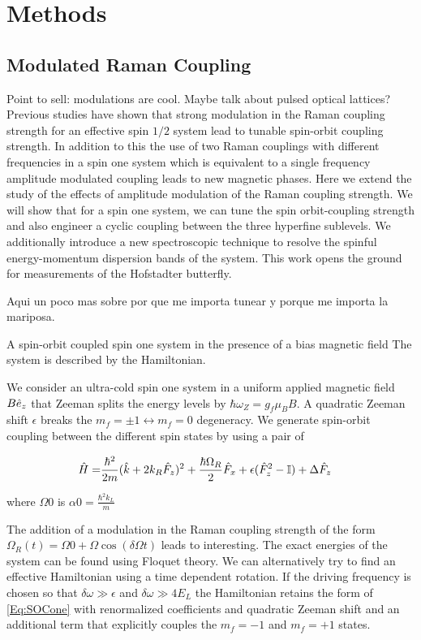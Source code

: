 \section{Methods}

 
\subsection{Modulated Raman Coupling}


Point to sell: modulations are cool. Maybe talk about pulsed optical lattices?
Previous studies have shown that strong modulation in the Raman coupling strength for an effective spin $1/2$ system lead to tunable spin-orbit coupling strength. In addition to this the use of two Raman couplings with different frequencies in a spin one system which is equivalent to a single frequency amplitude modulated coupling leads to new magnetic phases. Here we extend the study of the effects of amplitude modulation of the Raman coupling strength. We will show that for a spin one system, we can tune the spin orbit-coupling strength and also engineer a cyclic coupling between the three hyperfine sublevels. We additionally introduce a new spectroscopic technique to resolve the spinful energy-momentum dispersion bands of the system. This work opens the ground for measurements of the Hofstadter butterfly. 

Aqui un poco mas sobre por que me importa tunear y porque me importa la mariposa. 

A spin-orbit coupled spin one system in the presence of a bias magnetic field The system is described by the Hamiltonian. 

We consider an ultra-cold spin one system in a uniform applied magnetic field $B\boldmath\hat{e}_z$ that Zeeman splits the energy levels by $\hbar\omega_Z=g_f\mu_BB$. A quadratic Zeeman shift $\epsilon$ breaks the $m_f=\pm1\leftrightarrow m_f=0$ degeneracy. We generate spin-orbit coupling between the different spin states by using a pair of 

\begin{align}
	\begin{split}
		\hat{H} = & \frac{\hbar^2}{2m}(\hat{k}+2{{k_R}}\hat{F}_z)^2 + \frac{\hbar\Omega_R}{2}\hat{F}_x+\epsilon(\hat{F}_z^2-\mathbb{I})  +\Delta\hat{F}_z  
		\label{Eq:SOCone}
	\end{split}
\end{align}	

where $\Omega0$ is 
$\alpha0=\frac{\hbar^2k_L}{m}$


The addition of a modulation in the Raman coupling strength of the form $\Omega_R(t)=\Omega0 + \Omega\cos(\delta\Omega t)$	leads to interesting. The exact energies of the system can be found using Floquet theory. We can alternatively try to find an effective Hamiltonian using a time dependent rotation. If the driving frequency is chosen so that  $\delta\omega \gg \epsilon$ and $\delta\omega \gg 4E_L$ the Hamiltonian retains the form of \ref{Eq:SOCone} with renormalized coefficients and quadratic Zeeman shift and an additional term that explicitly couples the $m_f=-1$ and $m_f=+1$ states. 



